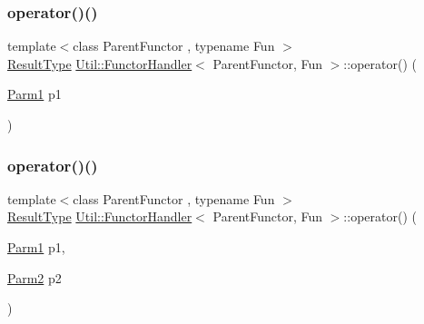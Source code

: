\mbox{\label{classUtil_1_1FunctorHandler_a38485a110bfa7b2fdb5e34553d2f7264}} 
\subsubsection{\texorpdfstring{operator()()}{operator()()}\hspace{0.1cm}{\footnotesize\ttfamily [4/12]}}
{\footnotesize\ttfamily template$<$class Parent\+Functor , typename Fun $>$ \\
\mbox{\hyperlink{classUtil_1_1FunctorHandler_a036da44b8cc2567704cebd2a20d16c80}{Result\+Type}} \mbox{\hyperlink{classUtil_1_1FunctorHandler}{Util\+::\+Functor\+Handler}}$<$ Parent\+Functor, Fun $>$\+::operator() (\begin{DoxyParamCaption}\item[{\mbox{\hyperlink{classUtil_1_1FunctorHandler_a0a902ba40a0ab746f1c29a81d68ae0db}{Parm1}}}]{p1 }\end{DoxyParamCaption})\hspace{0.3cm}{\ttfamily [inline]}}

\mbox{\label{classUtil_1_1FunctorHandler_a464269162477cf2b95690d94ec3fa02c}} 
\subsubsection{\texorpdfstring{operator()()}{operator()()}\hspace{0.1cm}{\footnotesize\ttfamily [5/12]}}
{\footnotesize\ttfamily template$<$class Parent\+Functor , typename Fun $>$ \\
\mbox{\hyperlink{classUtil_1_1FunctorHandler_a036da44b8cc2567704cebd2a20d16c80}{Result\+Type}} \mbox{\hyperlink{classUtil_1_1FunctorHandler}{Util\+::\+Functor\+Handler}}$<$ Parent\+Functor, Fun $>$\+::operator() (\begin{DoxyParamCaption}\item[{\mbox{\hyperlink{classUtil_1_1FunctorHandler_a0a902ba40a0ab746f1c29a81d68ae0db}{Parm1}}}]{p1,  }\item[{\mbox{\hyperlink{classUtil_1_1FunctorHandler_a5fb5374c316f8ac252aa22fcdf7d21a7}{Parm2}}}]{p2 }\end{DoxyParamCaption})\hspace{0.3cm}{\ttfamily [inline]}}

